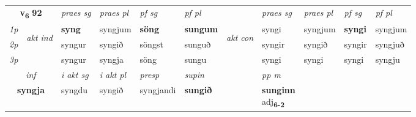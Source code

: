 \noindent
\begin{tabular}{lllllllllll} \toprule
\multicolumn{2}{c}{\textbf{v{\textsubscript{6}}} \Large{\textbf{92}}}  &  \textit{praes sg}  & \textit{praes pl}  &\textit{ pf sg} & \textit{pf pl} &  &  \textit{praes sg}  & \textit{praes pl}  & \textit{pf sg} & \textit{pf pl } \\*
	\cmidrule{3-6} \cmidrule{8-11}
 {\textit{1p}} & \multirow{3}{*}{\begin{turn}{90}\textit{akt ind}\end{turn}} & \textbf{syng} & syngjum & \textbf{söng} & \textbf{sungum} & \multirow{3}{*}{\begin{turn}{90}\textit{akt con}\end{turn}} &syngi & syngjum & \textbf{syngi} & syngjum\\*
 {\textit{2p}} &  &  syngur  & syngið & söngst & sunguð & & syngir & syngið & syngir & syngjuð \\*
{\textit{3p}} &  & syngur & syngja & söng & sungu & & syngi & syngi& syngi & syngju \\*
\cmidrule{3-6} \cmidrule{8-11}

   \multicolumn{2}{c}{\textit{inf}}  & \textit{i akt sg} & \textit{i akt pl}   & \textit{presp} & \textit{supin}  && \textit{pp m} \\*
  \multicolumn{2}{c}{\textbf{syngja}} & syngdu  & syngið   & syngjandi &  \textbf{sungið}  && \specialcell{\textbf{sunginn} \\ adj\textbf{\textsubscript{6-2}}} \\*
\end{tabular}

